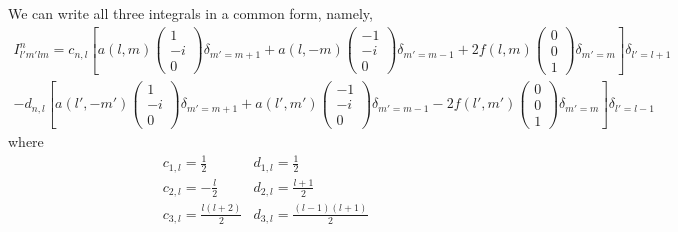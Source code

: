 \documentclass[aps,prb,floatfix,epsfig,singlecolumn,showpacs,preprintnumbers]{revtex4}
\begin{document}
We can write all three integrals in a common form, namely,
\begin{eqnarray}
I^n_{l'm'lm}=c_{n,l}
\left[
a(l,m)
\left(
\begin{array}{c}
1\\
-i\\
0
\end{array}
\right)
\delta_{m'=m+1}
+a(l,-m)
\left(
\begin{array}{c}
-1\\
-i\\
0
\end{array}
\right)
\delta_{m'=m-1}
+2 f(l,m)
\left(
\begin{array}{c}
0\\
0\\
1
\end{array}
\right)
\delta_{m'=m}
\right]\delta_{l'=l+1}
\nonumber\\
-d_{n,l}
\left[
a(l',-m')
\left(
\begin{array}{c}
1\\
-i\\
0
\end{array}
\right)
\delta_{m'=m+1}
+a(l',m')
\left(
\begin{array}{c}
-1\\
-i\\
0
\end{array}
\right)
\delta_{m'=m-1}
-2 f(l',m')
\left(
\begin{array}{c}
0\\
0\\
1
\end{array}
\right)
\delta_{m'=m}
\right]\delta_{l'=l-1}
\end{eqnarray}
where 
\begin{eqnarray}
& c_{1,l} = \frac{1}{2}      & d_{1,l}=\frac{1}{2}\\
& c_{2,l}=-\frac{l}{2}       & d_{2,l}=\frac{l+1}{2}\\
& c_{3,l}=\frac{l(l+2)}{2} & d_{3,l}=\frac{(l-1)(l+1)}{2}
\end{eqnarray}
\end{document}
